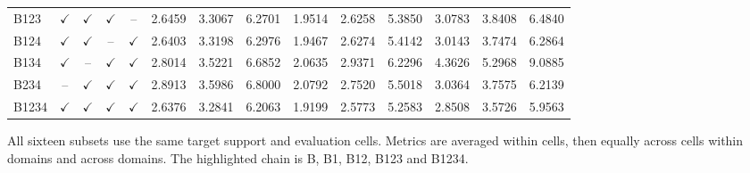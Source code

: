 \begin{table}[!htbp]
\begin{tabular}{lcccc*{9}{r}}
\rowcolor{gray!12}
B123 & $\checkmark$ & $\checkmark$ & $\checkmark$ & -- & 2.6459 & 3.3067 & 6.2701 & 1.9514 & 2.6258 & 5.3850 & 3.0783 & 3.8408 & 6.4840 \\
B124 & $\checkmark$ & $\checkmark$ & -- & $\checkmark$ & 2.6403 & 3.3198 & 6.2976 & 1.9467 & 2.6274 & 5.4142 & 3.0143 & 3.7474 & 6.2864 \\
B134 & $\checkmark$ & -- & $\checkmark$ & $\checkmark$ & 2.8014 & 3.5221 & 6.6852 & 2.0635 & 2.9371 & 6.2296 & 4.3626 & 5.2968 & 9.0885 \\
B234 & -- & $\checkmark$ & $\checkmark$ & $\checkmark$ & 2.8913 & 3.5986 & 6.8000 & 2.0792 & 2.7520 & 5.5018 & 3.0364 & 3.7575 & 6.2139 \\
\rowcolor{gray!12}
B1234 & $\checkmark$ & $\checkmark$ & $\checkmark$ & $\checkmark$ & 2.6376 & 3.2841 & 6.2063 & 1.9199 & 2.5773 & 5.2583 & 2.8508 & 3.5726 & 5.9563 \\
\bottomrule\end{tabular}
\par\smallskip\begin{minipage}{\columnwidth}\papertablesize All sixteen subsets use the same target support and evaluation cells. Metrics are averaged within cells, then equally across cells within domains and across domains. The highlighted chain is B, B1, B12, B123 and B1234.\end{minipage}
\end{table}
